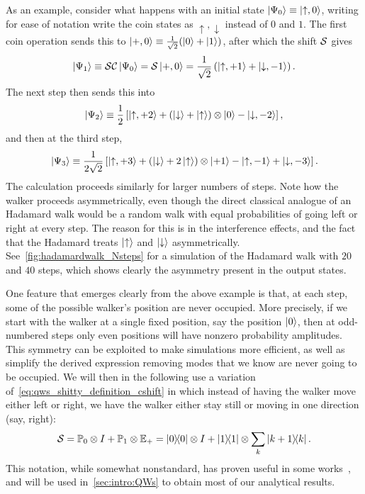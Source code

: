 \begin{example}[label=ex:hadamard_walk]
As an example, consider what happens with an initial state $\ket{\Psi_0}\equiv\ket{\uparrow,0}$, writing for ease of notation write the coin states as $\uparrow,\downarrow$ instead of $0$ and $1$.
The first coin operation sends this to $\ket{+,0}\equiv\frac{1}{\sqrt2}(\ket0+\ket1)$, after which the shift ${\mathcal{S}}$ gives
\begin{equation}
    \ket{\Psi_1} \equiv 
    {\mathcal{S}}{\mathcal{C}}\ket{\Psi_0} =
    {\mathcal{S}}\ket{+,0} =
    \frac{1}{\sqrt2} \left( \ket{\uparrow,+1} + \ket{\downarrow, -1} \right).
\end{equation}
The next step then sends this into
\begin{equation}
    \ket{\Psi_2} \equiv
    \frac12\left[
        \ket{\uparrow,+2} +
        (\ket{\downarrow}
        + \ket{\uparrow})\otimes \ket{0}
        - \ket{\downarrow, -2}
    \right],
\end{equation}
and then at the third step,
\begin{equation}
    \ket{\Psi_3} \equiv
    \frac{1}{2\sqrt2}\left[
        \ket{\uparrow,+3} +
        (\ket{\downarrow} + 2\ket{\uparrow})\otimes \ket{+1}
        - \ket{\uparrow,-1}
        + \ket{\downarrow,-3}
    \right].
\end{equation}
The calculation proceeds similarly for larger numbers of steps.
Note how the walker proceeds asymmetrically, even though the direct classical analogue of an Hadamard walk would be a random walk with equal probabilities of going left or right at every step.
The reason for this is in the interference effects, and the fact that the Hadamard treats $\ket\uparrow$ and $\ket\downarrow$ asymmetrically.
See~\cref{fig:hadamardwalk_Nsteps} for a simulation of the Hadamard walk with $20$ and $40$ steps, which shows clearly the asymmetry present in the output states.
\end{example}

One feature that emerges clearly from the above example is that, at each step, some of the possible walker's position are never occupied. More precisely, if we start with the walker at a single fixed position, say the position $\ket0$, then at odd-numbered steps only even positions will have nonzero probability amplitudes.
This symmetry can be exploited to make simulations more efficient, as well as simplify the derived expression removing modes that we know are never going to be occupied.
We will then in the following use a variation of~\cref{eq:qws_shitty_definition_cshift} in which instead of having the walker move either left or right, we have the walker either stay still or moving in one direction (say, right):
\begin{equation}
    {\mathcal{S}} = {\mathbb{P}}_0\otimes I + {\mathbb{P}}_1\otimes {\mathbb{E}}_+
    =\ketbra0\otimes I +\ketbra1\otimes\sum_k\ketbra{k+1}{k}.
\end{equation}
This notation, while somewhat nonstandard, has proven useful in some works~\cite{hoyer2009faster,montero2013unidirectional,montero2015quantum}, and will be used in~\cref{sec:intro:QWs} to obtain most of our analytical results.


